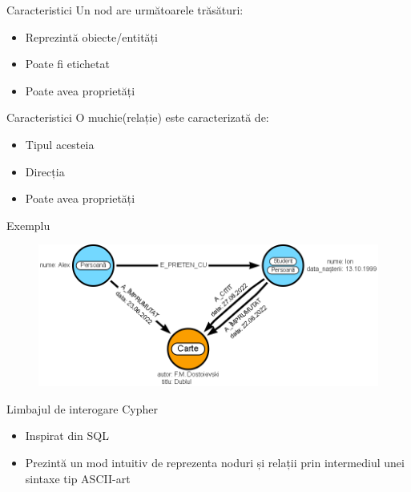 \documentclass{beamer}
\begin{document}
\begin{frame}{Caracteristici}
    Un nod are următoarele trăsături:
    
    \begin{itemize}
        \item Reprezintă obiecte/entități
        \item Poate fi etichetat
        \item Poate avea proprietăți
    \end{itemize}
    
    
\end{frame}

\begin{frame}{Caracteristici}
    O muchie(relație) este caracterizată de:
    
    \begin{itemize}
        \item Tipul acesteia
        \item Direcția
        \item Poate avea proprietăți
    \end{itemize}
\end{frame}

\begin{frame}[fragile]{Exemplu}
    \begin{figure}[H]
        \centering
        \begin{adjustbox}{max size={\textwidth}{\textheight}}
        \includegraphics[scale = 0.4]{exemplu_1}
        \end{adjustbox}
    \end{figure}
\end{frame}

\begin{frame}{Limbajul de interogare Cypher}
    \begin{itemize}
        \item Inspirat din SQL
        \item Prezintă un mod intuitiv de reprezenta noduri și relații prin intermediul unei sintaxe tip ASCII-art
    \end{itemize}
\end{frame}
\end{document}
